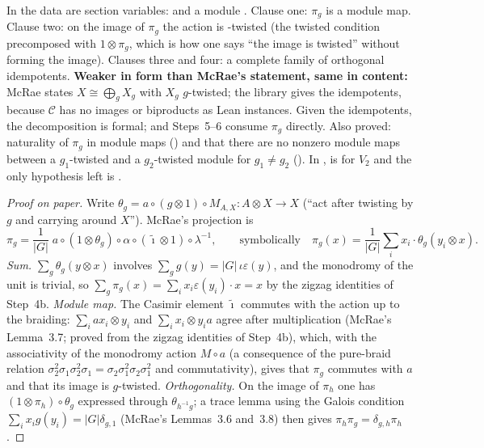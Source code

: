 \begin{dictionary}
In  the data are section variables:  and a module
. Clause one: $\pi_g$ is a module map. Clause two: on the image of $\pi_g$ the action is
-twisted (the twisted condition precomposed with $1\otimes\pi_g$, which is how one says ``the image is
twisted'' without forming the image). Clauses three and four: a complete family of orthogonal idempotents.
\textbf{Weaker in form than McRae's statement, same in content:} McRae states $X\cong\bigoplus_gX_g$ with $X_g$
$g$-twisted; the library gives the idempotents, because $\mathcal C$ has no images or biproducts as Lean instances.
Given the idempotents, the decomposition is formal; and Steps~5--6 consume $\pi_g$ directly. Also proved: naturality
of $\pi_g$ in module maps () and that there are no nonzero module maps between a $g_1$-twisted and a
$g_2$-twisted module for $g_1\ne g_2$ (). In ,
 is  for $V_2$ and the only hypothesis left is .
\end{dictionary}

\begin{proof}[Proof on paper]
Write $\theta_g=a\circ(g\otimes1)\circ M_{A,X}:A\otimes X\to X$ (``act after twisting by $g$ and carrying around $X$'').
McRae's projection is
\begin{equation*}
  \pi_g=\frac1{|G|}\;a\circ(1\otimes\theta_g)\circ\alpha\circ(\tilde\imath\otimes1)\circ\lambda^{-1},
  \qquad\text{symbolically}\quad \pi_g(x)=\frac1{|G|}\sum_i x_i\cdot\theta_g(y_i\otimes x).
\end{equation*}
\emph{Sum.} $\sum_g\theta_g(y\otimes x)$ involves $\sum_g g(y)=|G|\,\iota\varepsilon(y)$, and the monodromy of the unit is
trivial, so $\sum_g\pi_g(x)=\sum_ix_i\varepsilon(y_i)\cdot x=x$ by the zigzag identities of Step~4b. \emph{Module map.} The Casimir
element $\tilde\imath$ commutes with the action up to the braiding: $\sum_i ax_i\otimes y_i$ and $\sum_ix_i\otimes y_ia$ agree
after multiplication (McRae's Lemma~3.7; proved from the zigzag identities of Step~4b), which, with the associativity of the monodromy
action $M\circ a$ (a consequence of the pure-braid relation $\sigma_2^2\sigma_1\sigma_2^2\sigma_1=\sigma_2\sigma_1^2\sigma_2\sigma_1^2$
and commutativity), gives that $\pi_g$ commutes with $a$ and that its image is $g$-twisted. \emph{Orthogonality.}
On the image of $\pi_h$ one has $(1\otimes\pi_h)\circ\theta_g$ expressed through $\theta_{h^{-1}g}$; a trace lemma using the
Galois condition $\sum_ix_ig(y_i)=|G|\delta_{g,1}$ (McRae's Lemmas~3.6 and~3.8) then gives $\pi_h\pi_g=\delta_{g,h}\pi_h$.
\end{proof}

